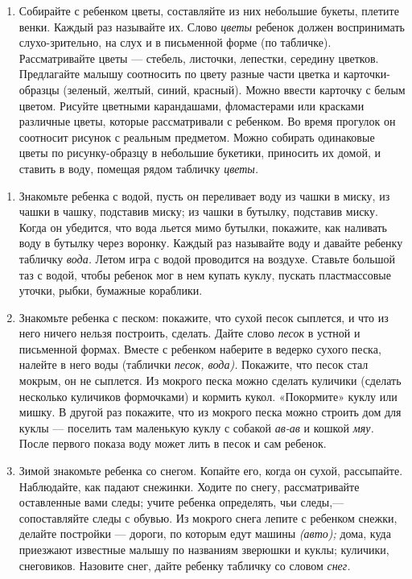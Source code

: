 \documentclass[a5paper]{book}
\renewcommand{\emph}[1]{\textit{#1}}
\begin{document}
\begin{enumerate}
\def\labelenumi{\arabic{enumi}.}
\item
  
  Собирайте с ребенком цветы, составляйте из них небольшие букеты,
  плетите венки. Каждый раз называйте их. Слово \emph{цветы} ребенок
  должен воспринимать слухо-зрительно, на слух и в письменной форме (по
  табличке). Рассматривайте цветы --- стебель, листочки, лепестки,
  середину цветков. Предлагайте малышу соотносить по цвету разные части
  цветка и карточки-образцы (зеленый, желтый, синий, красный). Можно
  ввести карточку с белым цветом. Рисуйте цветными карандашами,
  фломастерами или красками различные цветы, которые рассматривали с
  ребенком. Во время прогулок он соотносит рисунок с реальным предметом.
  Можно собирать одинаковые цветы по рисунку-образцу в небольшие
  букетики, приносить их домой, и ставить в воду, помещая рядом табличку
  \emph{цветы.}
  
\end{enumerate}

\begin{enumerate}
\def\labelenumi{\arabic{enumi}.}
\setcounter{enumi}{4}
\item
  
  Знакомьте ребенка с водой, пусть он переливает воду из чашки в миску,
  из чашки в чашку, подставив миску; из чашки в бутылку, подставив
  миску. Когда он убедится, что вода льется мимо бутылки, покажите, как
  наливать воду в бутылку через воронку. Каждый раз называйте воду и
  давайте ребенку табличку \emph{вода.} Летом игра с водой проводится на
  воздухе. Ставьте большой таз с водой, чтобы ребенок мог в нем купать
  куклу, пускать пластмассовые уточки, рыбки, бумажные кораблики.
  
\item
  
  Знакомьте ребенка с песком: покажите, что сухой песок сыплется, и что
  из него ничего нельзя построить, сделать. Дайте слово \emph{песок} в
  устной и письменной формах. Вместе с ребенком наберите в ведерко
  сухого песка, налейте в него воды (таблички \emph{песок, вода).}
  Покажите, что песок стал мокрым, он не сыплется. Из мокрого песка
  можно сделать куличики (сделать несколько куличиков формочками) и
  кормить кукол. «Покормите» куклу или мишку. В другой раз покажите, что
  из мокрого песка можно строить дом для куклы --- поселить там
  маленькую куклу с собакой \emph{ав-ав} и кошкой \emph{мяу.} После
  первого показа воду может лить в песок и сам ребенок.
  
\item
  
  Зимой знакомьте ребенка со снегом. Копайте его, когда он сухой,
  рассыпайте. Наблюдайте, как падают снежинки. Ходите по снегу,
  рассматривайте оставленные вами следы; учите ребенка определять, чьи
  следы,--- сопоставляйте следы с обувью. Из мокрого снега лепите с
  ребенком снежки, делайте постройки --- дороги, по которым едут машины
  \emph{(авто);} дома, куда приезжают известные малышу по названиям
  зверюшки и куклы; куличики, снеговиков. Назовите снег, дайте ребенку
  табличку со словом \emph{снег.}
  
\end{enumerate}
\end{document}
